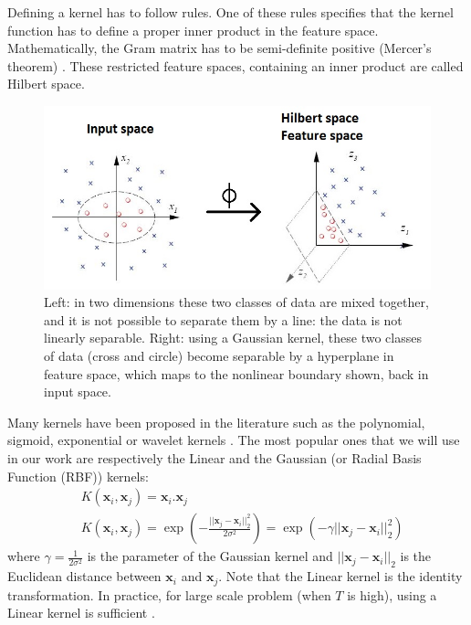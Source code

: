 \noindent Defining a kernel has to follow rules. One of these rules specifies that the kernel function has to define a proper inner product in the feature space. Mathematically, the Gram matrix has to be semi-definite positive (Mercer's theorem) \cite{Schlkopf2013}. These restricted feature spaces, containing an inner product are called Hilbert space.


\begin{figure}[h!]
\centering
\includegraphics[width=0.9\linewidth]{images/SVM_nonlinear2}
\caption{Left: in two dimensions these two classes of data are mixed together, and it is not possible to separate them by a line: the data is not linearly separable. Right: using a Gaussian kernel, these two classes of data (cross and circle) become separable by a hyperplane in feature space, which maps to the nonlinear boundary shown, back in input space.\protect\footnotemark}
\label{fig:SVM_nonlinear}
\end{figure}

Many kernels have been proposed in the literature such as the polynomial, sigmoid, exponential or wavelet kernels \cite{Schlkopf2013}. The most popular ones that we will use in our work are respectively the Linear and the Gaussian (or Radial Basis Function (RBF)) kernels:
\begin{align}
	& K(\textbf{x}_i,\textbf{x}_j)= \textbf{x}_i . \textbf{x}_j \\
	& K(\textbf{x}_i,\textbf{x}_j)
	= \exp(-\frac{||\textbf{x}_j-\textbf{x}_i||_2^2}{2\sigma^2})
	= \exp(-\gamma||\textbf{x}_j-\textbf{x}_i||_2^2)
\end{align}
where $\gamma = \frac{1}{2\sigma^2}$ is the parameter of the Gaussian kernel and $||\textbf{x}_j-\textbf{x}_i||_2$ is the Euclidean distance between $\textbf{x}_i$ and $\textbf{x}_j$. Note that the Linear kernel is the identity transformation. In practice, for large scale problem (when $T$ is high), using a Linear kernel is sufficient  \cite{Fan2008}.

